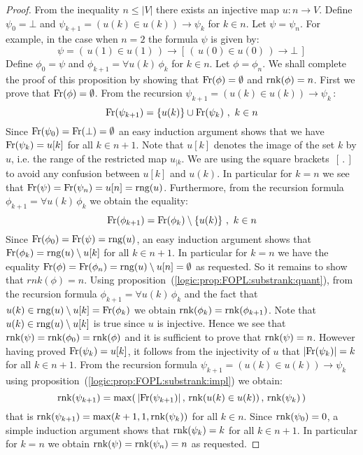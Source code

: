 \begin{proof}
From the inequality $n\leq |V|$ there exists an injective map
$u:n\to V$. Define $\psi_{0}=\bot$ and $\psi_{k+1}=(u(k)\in
u(k))\to\psi_{k}$ for $k\in n$. Let $\psi=\psi_{n}$. For example, in
the case when $n=2$ the formula $\psi$ is given by:
    \[
    \psi=(\,u(1)\in u(1)\,)\to[\,(\,u(0)\in u(0)\,)\to\bot\,]
    \]
Define $\phi_{0}=\psi$ and $\phi_{k+1}= \forall u(k)\, \phi_{k}$ for
$k\in n$. Let $\phi=\phi_{n}$. We shall complete the proof of this
proposition by showing that $\mbox{\rm Fr}(\phi)=\emptyset$ and
$\mbox{\rm rnk}(\phi)=n$. First we prove that $\mbox{\rm Fr}(\phi)=\emptyset$. From
the recursion $\psi_{k+1}=(u(k)\in u(k))\to\psi_{k}$\,:
    \[
    \free(\psi_{k+1})=\{u(k)\}\cup\free(\psi_{k})\ ,\ k\in n
    \]
Since $\mbox{\rm Fr}(\psi_{0})=\mbox{\rm Fr}(\bot)=\emptyset$ an easy induction
argument shows that we have $\mbox{\rm Fr}(\psi_{k})= u[k]$ for all $k\in
n+1$. Note that $u[k]$ denotes the image of the set $k$ by $u$, i.e.
the range of the restricted map $u_{|k}$. We are using the square
brackets~$[\,.\,]$ to avoid any confusion between $u[k]$ and $u(k)$.
In particular for $k=n$ we see that
$\mbox{\rm Fr}(\psi)=\mbox{\rm Fr}(\psi_{n})=u[n]=\mbox{\rm rng}(u)$. Furthermore, from the
recursion formula $\phi_{k+1}= \forall u(k)\, \phi_{k}$ we obtain
the equality:
    \[
    \free(\phi_{k+1})=\free(\phi_{k})\setminus\{u(k)\}\ ,\ k\in n
    \]
Since $\mbox{\rm Fr}(\phi_{0})=\mbox{\rm Fr}(\psi)=\mbox{\rm rng}(u)$, an easy induction
argument shows that $\mbox{\rm Fr}(\phi_{k})=\mbox{\rm rng}(u)\setminus u[k]$ for all
$k\in n+1$. In particular for $k=n$ we have the equality
$\mbox{\rm Fr}(\phi)=\mbox{\rm Fr}(\phi_{n})=\mbox{\rm rng}(u)\setminus u[n]=\emptyset$ as
requested. So it remains to show that $rnk(\phi)=n$. Using
proposition~(\ref{logic:prop:FOPL:substrank:quant}), from the
recursion formula $\phi_{k+1}= \forall u(k)\, \phi_{k}$ and the fact
that $u(k)\in \mbox{\rm rng}(u)\setminus u[k]=\mbox{\rm Fr}(\phi_{k})$ we obtain
$\mbox{\rm rnk}(\phi_{k})=\mbox{\rm rnk}(\phi_{k+1})$. Note that $u(k)\in
\mbox{\rm rng}(u)\setminus u[k]$ is true since $u$ is injective. Hence we see
that $\mbox{\rm rnk}(\psi)=\mbox{\rm rnk}(\phi_{0})=\mbox{\rm rnk}(\phi)$ and it is sufficient to
prove that $\mbox{\rm rnk}(\psi)=n$. However having proved $\mbox{\rm Fr}(\psi_{k})=
u[k]$, it follows from the injectivity of $u$ that
$|\mbox{\rm Fr}(\psi_{k})|=k$ for all $k\in n+1$. From the recursion formula
$\psi_{k+1}=(u(k)\in u(k))\to\psi_{k}$ using
proposition~(\ref{logic:prop:FOPL:substrank:impl}) we obtain:
    \[
    \mbox{\rm rnk}(\psi_{k+1})=\max(\,|\mbox{\rm Fr}(\psi_{k+1})|\,,\,\mbox{\rm rnk}(u(k)\in
    u(k))\,,\,\mbox{\rm rnk}(\psi_{k})\,)
    \]
that is $\mbox{\rm rnk}(\psi_{k+1})=\max(k+1,1,\mbox{\rm rnk}(\psi_{k}))$ for all $k\in
n$. Since $\mbox{\rm rnk}(\psi_{0})=0$, a simple induction argument shows that
$\mbox{\rm rnk}(\psi_{k})=k$ for all $k\in n+1$. In particular for $k=n$ we
obtain $\mbox{\rm rnk}(\psi)=\mbox{\rm rnk}(\psi_{n})=n$ as requested.
\end{proof}
